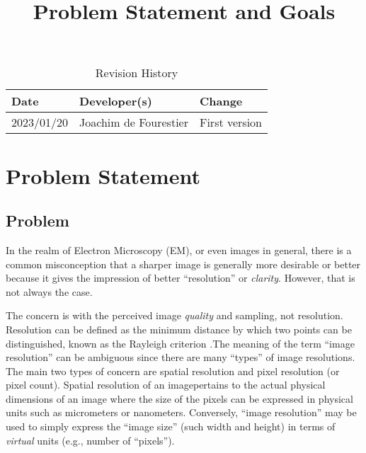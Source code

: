 \documentclass{article}
\title{Problem Statement and Goals\\\progname}
\author{\authname}
\date{}
\begin{document}
\maketitle

\begin{table}[hp] \caption{Revision History} \label{TblRevisionHistory}
\begin{tabularx}{\textwidth}{llX} \toprule \textbf{Date} & \textbf{Developer(s)}& \textbf{Change}\\ \midrule 2023/01/20 & Joachim de Fourestier & First
version\\ %
\bottomrule \end{tabularx} \end{table}

\section{Problem Statement}
\subsection{Problem}
In the realm of Electron Microscopy (EM), or even images in general, there is a
common misconception that a sharper image is generally more desirable or better
because it gives the impression of better “resolution” or {\it clarity}.
However, that is not always the case.

The concern is with the perceived image {\it quality} and sampling, not
resolution. Resolution can be defined as the minimum distance by which two
points can be distinguished, known as the Rayleigh criterion
\cite{blackburn_microscopy_2020}.The meaning of the term “image resolution” can
be ambiguous since there are many “types” of image resolutions. The main two
types of concern are spatial resolution and pixel resolution (or pixel count).
Spatial resolution of an imagepertains to the actual physical dimensions of an
image where the size of the pixels can be expressed in physical units such as
micrometers or nanometers. Conversely, “image resolution” may be used to simply
express the “image size” (such width and height) in terms of {\it virtual} units
(e.g., number of “pixels”).
\end{document}

